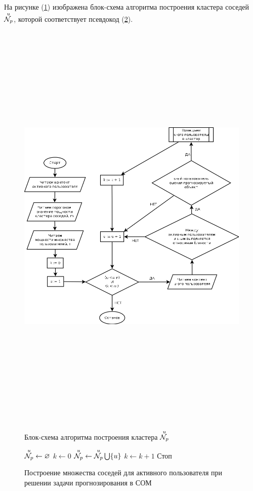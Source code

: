 На рисунке (\ref{dia:nup}) изображена блок-схема алгоритма
построения кластера соседей ${\overset{u}{\mathcal{N}_p}}$, которой соответствует псевдокод
(\ref{alg:nup}).
\begin{figure}[htb]
	\caption{Блок-схема алгоритма построения кластера ${\overset{u}{\mathcal{N}_p}}$}
\begin{center}
	\label{dia:nup}
 \includegraphics[width=7in,height=8in]{pics/algs/nup.png}
\end{center}
\end{figure}

\begin{figure}[htb]
		\caption{Построение множества соседей для активного
		пользователя при решении задачи прогнозирования в СОМ}
		\label{alg:nup}
		\begin{algorithmic}[1]
			\State ${\overset{u}{\mathcal{N}_p}} \gets \varnothing$
			\State $k \gets 0$
			\State ${\overset{u}{\mathcal{N}_p}} \gets {\overset{u}{\mathcal{N}_p}} \bigcup \{ u \}$
			\State $k \gets k + 1$
			\EndIf
			\State Стоп
			\EndIf
			\EndFor
		\end{algorithmic}
\end{figure}

